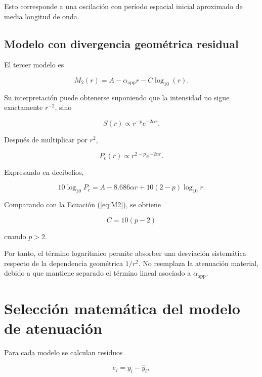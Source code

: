 Esto corresponde a una oscilación con período espacial inicial aproximado de media longitud de onda.

\subsection{Modelo con divergencia geométrica residual}

El tercer modelo es

\begin{equation}
M_2(r)
=
A
-
\alpha_{\mathrm{app}}r
-
C\log_{10}(r).
\label{eq:M2}
\end{equation}

Su interpretación puede obtenerse suponiendo que la intensidad no sigue exactamente $r^{-2}$, sino

\begin{equation}
S(r)
\propto
r^{-p}e^{-2\alpha r}.
\end{equation}

Después de multiplicar por $r^2$,

\begin{equation}
P_c(r)
\propto
r^{2-p}e^{-2\alpha r}.
\end{equation}

Expresando en decibelios,

\begin{equation}
10\log_{10}P_c
=
A
-
8.686\alpha r
+
10(2-p)\log_{10}r.
\end{equation}

Comparando con la Ecuación (\ref{eq:M2}), se obtiene

\begin{equation}
C
=
10(p-2)
\end{equation}

cuando $p>2$.

Por tanto, el término logarítmico permite absorber una desviación sistemática respecto de la dependencia geométrica $1/r^2$. No reemplaza la atenuación material, debido a que mantiene separado el término lineal asociado a $\alpha_{\mathrm{app}}$.

\section{Selección matemática del modelo de atenuación}

Para cada modelo se calculan residuos

\begin{equation}
e_i
=
y_i-\widehat{y}_i,
\end{equation}

